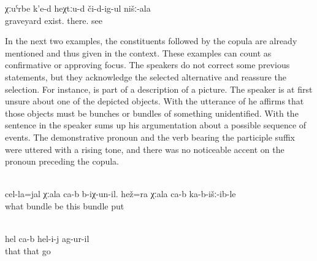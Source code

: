 \begin{exe}
	\ex	\label{ex:‎Up there the graveyard of ours is visible}
	\gll	χːuˁrbe	k'e-d	heχtːu-d	či-d-ig-ul	nišː-ala\\
		graveyard	exist.	there.	see	\\
	\glt	{}
\end{exe}

In the next two examples, the constituents followed by the copula are already mentioned and thus given in the context. These examples can count as confirmative or approving focus. The speakers do not correct some previous statements, but they acknowledge the selected alternative and reassure the selection. For instance,  is part of a description of a picture. The speaker is at first unsure about one of the depicted objects. With the utterance of  he affirms that those objects must be bunches or bundles of something unidentified. With the sentence in  the speaker sums up his argumentation about a possible sequence of events. The demonstrative pronoun and the verb bearing the participle suffix were uttered with a rising tone, and there was no noticeable accent on the pronoun preceding the copula.
%
\begin{exe}
		\\\label{ex:This is a BUNDLE of something. This BUNDLE also has been put down (there)@27a}%
		\gll	cel-la=jal	χːala	ca-b	b-iχ-un-il. 	hež=ra	χːala	ca-b	ka-b-išː-ib-le\\
			what	bundle		be 	this	bundle		put\\
		\glt	{}

		\\\label{ex:This is it what has happened to him@27b}
		\gll	hel	ca-b	hel-i-j	ag-ur-il\\
			that		that	go\\
		\glt	{}
\end{exe}

